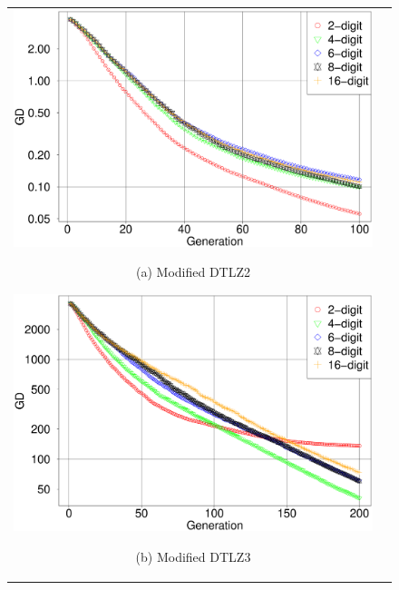\documentclass[../main/main]{subfiles}
\begin{document}
\clearpage
\begin{figure}[htbp]
\begin{tabular}{cc}
\begin{minipage}{0.32\hsize}
\includegraphics[width=1\linewidth]{../figures/NSGA-II/ano_DTLZ2_GD.eps}
\begin{center}
{\footnotesize (a) Modified DTLZ2}
\end{center}
\end{minipage}
\begin{minipage}{0.32\hsize}
\includegraphics[width=1\linewidth]{../figures/NSGA-II/ano_DTLZ3_GD.eps}
\begin{center}
{\footnotesize (b) Modified DTLZ3}
\end{center}
\end{minipage}
\begin{minipage}{0.32\hsize}

\end{minipage}
\end{tabular}
\end{figure}
\end{document}
